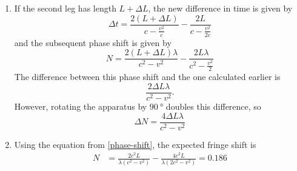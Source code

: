 \documentclass[fleqn]{article}[11pt]
\begin{document}
\begin{enumerate}
\begin{enumerate}
        \item If the second leg has length $L+\Delta L$, the new difference in time is given by
        \begin{equation*}
            \Delta t = \frac{2(L+\Delta L)}{c-\frac{v^2}{c}} - \frac{2L}{c-\frac{v^2}{2c}}
        \end{equation*}
        and the subsequent phase shift is given by
        \begin{equation*}
            N = \frac{2(L+\Delta L)\lambda}{c^2-v^2} - \frac{2L\lambda}{c^2-\frac{v^2}{2}}
        \end{equation*}
        The difference between this phase shift and the one calculated earlier is
        \begin{equation*}
            \frac{2 \Delta L \lambda}{c^2-v^2}.
        \end{equation*}
        However, rotating the apparatus by $\SI{90}{\degree}$ doubles this difference, so
        \begin{equation*}
            \Delta N = \frac{4\Delta L \lambda}{c^2-v^2}
        \end{equation*}

        \item Using the equation from \ref{phase-shift}, the expected fringe shift is
        \begin{align*}
            N &= \frac{2 c^2 L}{\lambda \left(c^2-v^2\right)}-\frac{4 c^2 L}{\lambda \left(2 c^2-v^2\right)} = 0.186
        \end{align*}
    \end{enumerate}



\end{enumerate}
\end{document}
